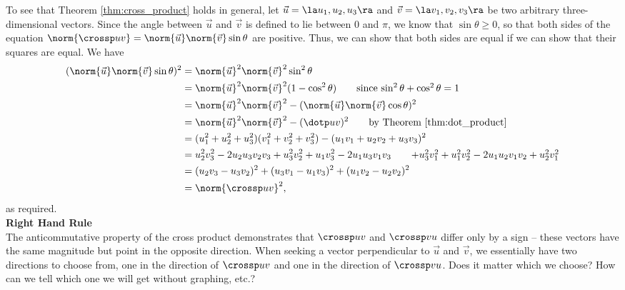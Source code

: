 To see that Theorem \ref{thm:cross_product} holds in general, let $\vec u=\la u_1,u_2,u_3\ra$ and $\vec v =\la v_1,v_2,v_3\ra$ be two arbitrary three-dimensional vectors. Since the angle between $\vec u$ and $\vec v$ is defined to lie between 0 and $\pi$, we know that $\sin\theta\geq 0$, so that both sides of the equation $\norm{\crossp uv} = \norm{\vec{u}}\norm{\vec v}\sin\theta$ are positive. Thus, we can show that both sides are equal if we can show that their squares are equal. We have
\begin{align*}
(\norm{\vec u}\norm{\vec v}\sin\theta)^2 & = \norm{\vec u}^2\norm{\vec v}^2\sin^2\theta\\
& = \norm{\vec u}^2\norm{\vec v}^2(1-\cos^2\theta) \tag*{since $\sin^2\theta+\cos^2\theta=1$}\\
& = \norm{\vec u}^2\norm{\vec v}^2-(\norm{\vec u}\norm{\vec v}\cos\theta)^2\\
& = \norm{\vec u}^2\norm{\vec v}^2-(\dotp uv)^2 \tag*{by Theorem \ref{thm:dot_product}}\\
& = (u_1^2+u_2^2+u_3^2)(v_1^2+v_2^2+v_3^2)-(u_1v_1+u_2v_2+u_3v_3)^2\\
& = u_2^2v_3^2 - 2u_2u_3v_2v_3 + u_3^2v_2^2 + u_1v_3^2 - 2u_1u_3v_1v_3 \tag*{$+ u_3^2v_1^2 + u_1^2v_2^2 - 2u_1u_2v_1v_2 + u_2^2v_1^2$}\\
& = (u_2v_3-u_3v_2)^2+(u_3v_1-u_1v_3)^2+(u_1v_2-u_2v_2)^2\\
& = \norm{\crossp uv}^2,
\end{align*}
as required.\\




\noindent\textbf{Right Hand Rule}\\

The anticommutative property of the cross product demonstrates that $\crossp uv$ and $\crossp vu$ differ only by a sign -- these vectors have the same magnitude but point in the opposite direction. When seeking a vector perpendicular to $\vec u$ and $\vec v$, we essentially have two directions to choose from, one in the direction of $\crossp uv$ and one in the direction of $\crossp vu$. Does it matter which we choose? How can we tell which one we will get without graphing, etc.?

